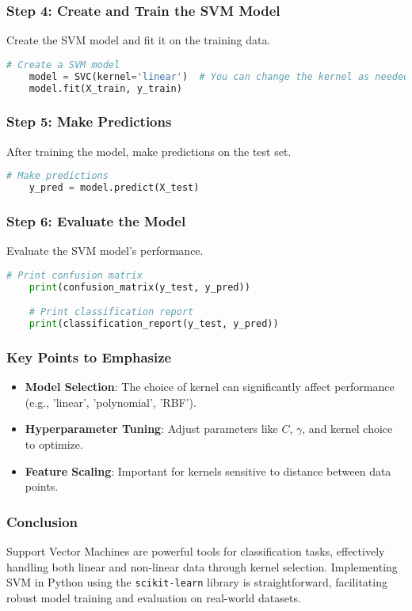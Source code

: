 \documentclass[aspectratio=169]{beamer}
\begin{document}
\begin{frame}[fragile]
    \frametitle{Step 4: Create and Train the SVM Model}
    Create the SVM model and fit it on the training data.
    \begin{lstlisting}[language=Python]
    # Create a SVM model
    model = SVC(kernel='linear')  # You can change the kernel as needed
    model.fit(X_train, y_train)
    \end{lstlisting}
\end{frame}

\begin{frame}[fragile]
    \frametitle{Step 5: Make Predictions}
    After training the model, make predictions on the test set.
    \begin{lstlisting}[language=Python]
    # Make predictions
    y_pred = model.predict(X_test)
    \end{lstlisting}
\end{frame}

\begin{frame}[fragile]
    \frametitle{Step 6: Evaluate the Model}
    Evaluate the SVM model's performance.
    \begin{lstlisting}[language=Python]
    # Print confusion matrix
    print(confusion_matrix(y_test, y_pred))

    # Print classification report
    print(classification_report(y_test, y_pred))
    \end{lstlisting}
\end{frame}

\begin{frame}
    \frametitle{Key Points to Emphasize}
    \begin{itemize}
        \item \textbf{Model Selection}: The choice of kernel can significantly affect performance (e.g., 'linear', 'polynomial', 'RBF').
        \item \textbf{Hyperparameter Tuning}: Adjust parameters like $C$, $\gamma$, and kernel choice to optimize.
        \item \textbf{Feature Scaling}: Important for kernels sensitive to distance between data points.
    \end{itemize}
\end{frame}

\begin{frame}
    \frametitle{Conclusion}
    Support Vector Machines are powerful tools for classification tasks, effectively handling both linear and non-linear data through kernel selection.
    Implementing SVM in Python using the \texttt{scikit-learn} library is straightforward, facilitating robust model training and evaluation on real-world datasets.
\end{frame}
\end{document}
